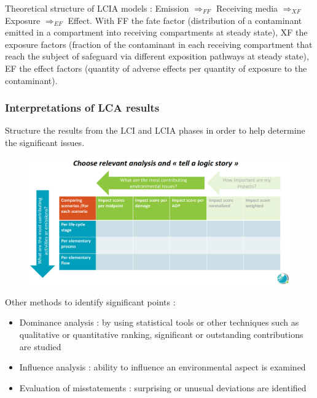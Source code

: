 \documentclass[../main.tex]{subfiles}
\begin{document}
Theoretical structure of LCIA models : Emission $\Rightarrow_{FF}$ Receiving media $\Rightarrow_{XF}$ Exposure $\Rightarrow_{EF}$ Effect. With FF the fate factor (distribution of a contaminant emitted in a compartment into receiving compartments at steady state), XF the exposure factors (fraction of the contaminant in each receiving compartment that reach the subject of safeguard via different exposition pathways at steady state), EF the effect factors (quantity of adverse effects per quantity of exposure to the contaminant).\\

\subsubsection{Interpretations of LCA results}
Structure the results from the LCI and LCIA phases in order to help determine the significant issues. \\

\begin{figure}[hbt!]
    \centering
    \includegraphics[width=0.8\linewidth]{IMAGES/LCA/Screenshot from 2024-11-19 16-42-24.png}
\end{figure}

Other methods to identify significant points : \begin{itemize}
    \item Dominance analysis : by using statistical tools or other techniques such as qualitative or quantitative ranking, significant or outstanding contributions are studied
    \item Influence analysis : ability to influence an environmental aspect is examined
    \item Evaluation of misstatements : surprising or unusual deviations are identified
\end{itemize}
\end{document}
